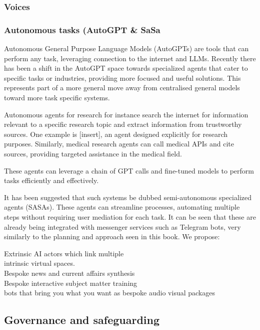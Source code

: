\subsubsection{Voices}
\subsubsection{Autonomous tasks (AutoGPT \& SaSa}

Autonomous General Purpose Language Models (AutoGPTs) are tools that can perform any task, leveraging connection to the internet and LLMs. Recently there has been a shift in the AutoGPT space towards specialized agents that cater to specific tasks or industries, providing more focused and useful solutions. This represents part of a more general move away from centralised general models toward more task specific systems.\par
Autonomous agents for research for instance search the internet for information relevant to a specific research topic and extract information from trustworthy sources. One example is [insert], an agent designed explicitly for research purposes. Similarly, medical research agents can call medical APIs and cite sources, providing targeted assistance in the medical field.\par
These agents can leverage a chain of GPT calls and fine-tuned models to perform tasks efficiently and effectively.\par
It has been suggested that such systems be dubbed semi-autonomous specialized agents (SASAs). These agents can streamline processes, automating multiple steps without requiring user mediation for each task. It can be seen that these are already being integrated with messenger services such as Telegram bots, very similarly to the planning and approach seen in this book.
We propose:\par

Extrinsic AI actors which link multiple\\ intrinsic virtual spaces.\\
Bespoke news and current affairs synthesis\\
Bespoke interactive subject matter training\\
bots that bring you what you want as bespoke audio visual packages
\subsection{Governance and safeguarding}
